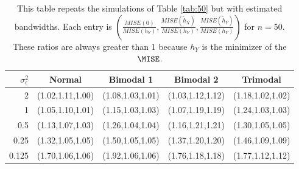 \begin{table}[ht]
\centering
\begin{tabular}{r|cccc}
  \hline
$\sigma_{\epsilon}^2$ & Normal & Bimodal 1 & Bimodal 2 & Trimodal \\ 
  \hline
2 & (1.02,1.11,1.00) & (1.08,1.03,1.01) & (1.03,1.12,1.12) & (1.18,1.02,1.02) \\ 
  1 & (1.05,1.10,1.01) & (1.15,1.03,1.03) & (1.07,1.19,1.19) & (1.24,1.03,1.03) \\ 
  0.5 & (1.13,1.07,1.03) & (1.26,1.04,1.04) & (1.16,1.21,1.21) & (1.30,1.05,1.05) \\ 
  0.25 & (1.32,1.05,1.05) & (1.50,1.05,1.05) & (1.37,1.20,1.20) & (1.46,1.09,1.09) \\ 
  0.125 & (1.70,1.06,1.06) & (1.92,1.06,1.06) & (1.76,1.18,1.18) & (1.77,1.12,1.12) \\ 
   \hline
\end{tabular}
\caption{This table repeats the simulations of Table \ref{tab:50} but with estimated bandwidths. Each entry is $\left(\frac{MISE(0)}{MISE(h_Y)},\frac{MISE(\widetilde{h}_X)}{MISE(h_Y)},\frac{MISE(\widetilde{h}_Y)}{MISE(h_Y)}\right)$ for $n=50$. These ratios are always greater than $1$ because $h_Y$ is the minimizer of the $\MISE$.} 
\label{tab:est50}
\end{table}
